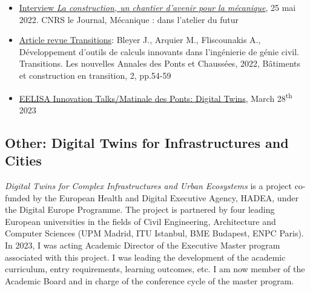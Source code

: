 \begin{itemize}
\item \href{https://lejournal.cnrs.fr/articles/la-construction-un-chantier-davenir-pour-la-mecanique}{Interview \textit{La construction, un chantier d’avenir pour la mécanique}}, 25 mai 2022. CNRS le Journal, Mécanique : dans l’atelier du futur
\item \href{https://ecoledesponts.fr/batiments-et-construction-en-transition-parution-de-la-deuxieme-edition-de-la-revue-transitions-les}{Article revue Transitions}: Bleyer J., Arquier M., Fliscounakis A., Développement d'outils de calculs innovants dans l'ingénierie de génie civil. Transitions. Les nouvelles Annales des Ponts et Chaussées, 2022, Bâtiments et construction en transition, 2, pp.54-59
\item \href{https://www.youtube.com/watch?v=w-X8OH8cmj0}{EELISA Innovation Talks/Matinale des Ponts: Digital Twins}, March 28\textsuperscript{th} 2023
\end{itemize}

\subsection*{\textcolor{navier_blue}{Other: Digital Twins for Infrastructures and Cities}}
\textit{Digital Twins for Complex Infrastructures and Urban Ecosystems} is a project co-funded by the European Health and Digital Executive Agency, HADEA, under the Digital Europe Programme. The project is partnered by four leading European universities in the fields of Civil Engineering, Architecture and Computer Sciences (UPM Madrid, ITU Istanbul, BME Budapest, ENPC Paris). In 2023, I was acting Academic Director of the Executive Master program associated with this project. I was leading the development of the academic curriculum, entry requirements, learning outcomes, etc. I am now member of the Academic Board and in charge of the conference cycle of the master program.

